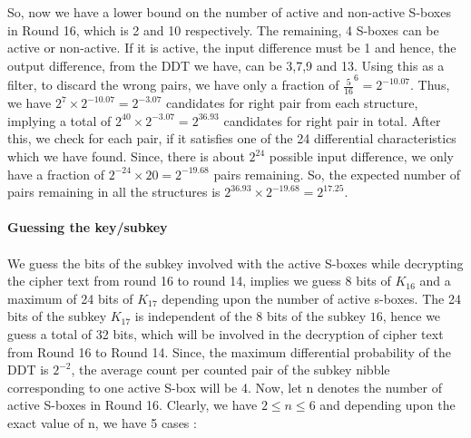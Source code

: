 \documentclass[preprint]{transcrypto}
\begin{document}
So, now we have a lower bound on the number of active and non-active S-boxes in Round 16, which is 2 and 10 respectively. The remaining, 4 S-boxes can be active or non-active. If it is active, the input difference must be 1 and hence, the output difference, from the DDT we have, can be 3,7,9 and 13. Using this as a filter, to discard the wrong pairs, we have only a fraction of $\frac{5}{16}^6 = 2^{-10.07}$. Thus, we have $2^7 \times 2^{-10.07} = 2^{-3.07}$ candidates for right pair from each structure, implying a total of $2^{40} \times 2^{-3.07} = 2^{36.93}$ candidates for right pair in total. After this, we check for each pair, if it satisfies one of the 24 differential characteristics which we have found. Since, there is about $2^{24}$ possible input difference, we only have a fraction of $2^{-24} \times 20 = 2^{-19.68}$ pairs remaining. So, the expected number of pairs remaining in all the structures is $2^{36.93} \times 2^{-19.68} = 2^{17.25}$. \\ \\
\textbf{Guessing the key/subkey} \\ \\
We guess the bits of the subkey involved with the active S-boxes while decrypting the cipher text from round 16 to round 14, implies we guess 8 bits of $K_{16}$ and a maximum of 24 bits of $K_{17}$ depending upon the number of active s-boxes. The 24 bits of the subkey $K_{17}$ is independent of the 8 bits of the subkey $16$, hence we guess a total of 32 bits, which will be involved in the decryption of cipher text from Round 16 to Round 14. Since, the maximum differential probability of the DDT is $2^{-2}$, the average count per counted pair of the subkey
nibble corresponding to one active S-box will be 4. Now, let n denotes the number of active S-boxes in Round 16. Clearly, we have $2 \leq n \leq 6$ and depending upon the exact value of n, we have 5 cases : 
\end{document}
